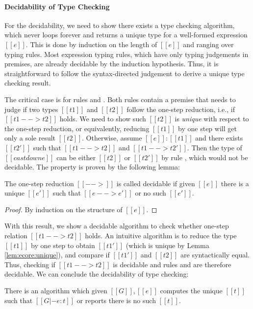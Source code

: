 \paragraph{Decidability of Type Checking}
For the decidability, we need to show there exists a type checking
algorithm, which never loops forever and returns a unique type for a
well-formed expression $[[e]]$. This is done by induction on the
length of $[[e]]$ and ranging over typing rules. Most expression
typing rules, which have only typing judgements in premises, are
already decidable by the induction hypothesis. Thus, it is
straightforward to follow the syntax-directed judgement to derive a
unique type checking result.

The critical case is for rules  and
.  Both rules contain a premise that needs to
judge if two types $[[t1]]$ and $[[t2]]$ follow the one-step
reduction, i.e., if $[[t1 --> t2]]$ holds. We need to show such
$[[t2]]$ is \emph{unique} with respect to the one-step reduction, or
equivalently, reducing $[[t1]]$ by one step will get only a sole
result $[[t2]]$. Otherwise, assume $[[e]]:[[t1]]$ and there exists
$[[t2']]$ such that $[[t1 --> t2]]$ and $[[t1 --> t2']]$. Then the
type of $[[castdown e]]$ can be either $[[t2]]$ or $[[t2']]$ by rule
, which would not be decidable. The property is
proven by the following lemma:

\begin{lem}\label{lem:ecore:unique}
	The one-step reduction $[[-->]]$ is called decidable if 
given $[[e]]$ there is a unique $[[e']]$ such that $[[e --> e']]$ or no such $[[e']]$.
\end{lem}

\begin{proof}
	By induction on the structure of $[[e]]$.
\end{proof}

With this result, we show a decidable algorithm to check whether
one-step relation $[[t1 --> t2]]$ holds. An intuitive algorithm is to
reduce the type $[[t1]]$ by one step to obtain $[[t1']]$ (which is
unique by Lemma \ref{lem:ecore:unique}), and compare if $[[t1']]$ and
$[[t2]]$ are syntactically equal. Thus, checking if $[[t1 --> t2]]$ is
decidable and rules  and  are
therefore decidable. We can conclude the decidability of type
checking:

\begin{thm}\label{lem:ecore:decide}
	There is an algorithm which given $[[G]], [[e]]$ computes the unique
$[[t]]$ such that $[[G |- e:t]]$ or reports there is no such $[[t]]$.
\end{thm}

